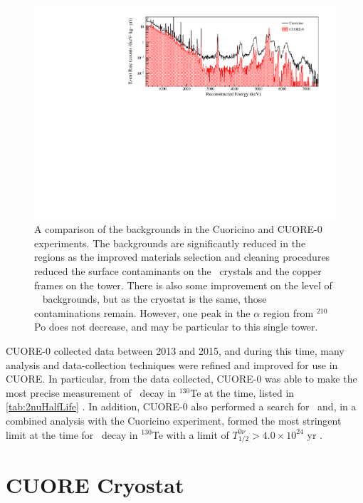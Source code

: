 \begin{figure}[htpb]
    \centering
    \includegraphics[width=\linewidth]{Figures/CUORE-0_vs_Cuoricino.pdf}
    \caption[A comparison of the backgrounds in the Cuoricino and CUORE-0 exeperiments.]
    {A comparison of the backgrounds in the Cuoricino and CUORE-0 experiments.
    The backgrounds are significantly reduced in the \gamma~ regions as the improved materials selection and cleaning procedures reduced the surface contaminants on the \teotwo~crystals and the copper frames on the tower.
    There is also some improvement on the level of \gamma~ backgrounds, but as the cryostat is the same, those contaminations remain.
    However, one peak in the $\alpha$ region from $^{210}$Po does not decrease, and may be particular to this single tower.}
    \label{fig:cuore-0_vs_cuoricino}
\end{figure}

CUORE-0 collected data between 2013 and 2015, and during this time, many analysis and data-collection techniques were refined and improved for use in CUORE.
In particular, from the data collected, CUORE-0 was able to make the most precise measurement of \twonubb~decay in $^{130}$Te at the time, listed in \autoref{tab:2nuHalfLife} \cite{Alduino:2016vtd}.
In addition, CUORE-0 also performed a search for \zeronubb~and, in a combined analysis with the Cuoricino experiment, formed the most stringent limit at the time for \zeronubb~decay in $^{130}$Te with a limit of $T^{0ν}_{1/2}>4.0\times10^{24}$ yr \cite{Alfonso:2015wka}.

\section{CUORE Cryostat}
\label{sec:CUORE Cryostat}

